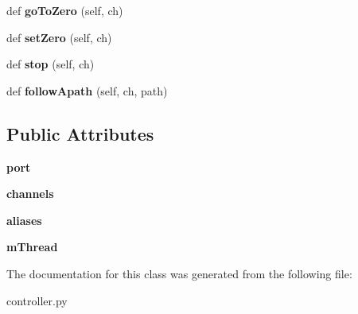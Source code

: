 \begin{DoxyCompactItemize}
\item 
\hypertarget{classpyagilis_1_1controller_1_1_a_g_u_c8_ac6a1b091b8351096db6abd5d9aa09a42}{}def {\bfseries go\+To\+Zero} (self, ch)\label{classpyagilis_1_1controller_1_1_a_g_u_c8_ac6a1b091b8351096db6abd5d9aa09a42}

\item 
\hypertarget{classpyagilis_1_1controller_1_1_a_g_u_c8_a792b3c9ce6d0365b65d1bf75acf9c179}{}def {\bfseries set\+Zero} (self, ch)\label{classpyagilis_1_1controller_1_1_a_g_u_c8_a792b3c9ce6d0365b65d1bf75acf9c179}

\item 
\hypertarget{classpyagilis_1_1controller_1_1_a_g_u_c8_af8908bdd36660efbf728cf9e216ae283}{}def {\bfseries stop} (self, ch)\label{classpyagilis_1_1controller_1_1_a_g_u_c8_af8908bdd36660efbf728cf9e216ae283}

\item 
\hypertarget{classpyagilis_1_1controller_1_1_a_g_u_c8_aba2c96a77f17f21613d07f152abee0a3}{}def {\bfseries follow\+Apath} (self, ch, path)\label{classpyagilis_1_1controller_1_1_a_g_u_c8_aba2c96a77f17f21613d07f152abee0a3}

\end{DoxyCompactItemize}
\subsection*{Public Attributes}
\begin{DoxyCompactItemize}
\item 
\hypertarget{classpyagilis_1_1controller_1_1_a_g_u_c8_a1fbc03520bbc818fa6b7068c2d18082c}{}{\bfseries port}\label{classpyagilis_1_1controller_1_1_a_g_u_c8_a1fbc03520bbc818fa6b7068c2d18082c}

\item 
\hypertarget{classpyagilis_1_1controller_1_1_a_g_u_c8_a0e10ce1697aba8e72640dfcb70a20676}{}{\bfseries channels}\label{classpyagilis_1_1controller_1_1_a_g_u_c8_a0e10ce1697aba8e72640dfcb70a20676}

\item 
\hypertarget{classpyagilis_1_1controller_1_1_a_g_u_c8_a808be674a6d2dd0227d90260b8e84c5a}{}{\bfseries aliases}\label{classpyagilis_1_1controller_1_1_a_g_u_c8_a808be674a6d2dd0227d90260b8e84c5a}

\item 
\hypertarget{classpyagilis_1_1controller_1_1_a_g_u_c8_ab8f488a1f3eb3142d82a38ff8c4303e4}{}{\bfseries m\+Thread}\label{classpyagilis_1_1controller_1_1_a_g_u_c8_ab8f488a1f3eb3142d82a38ff8c4303e4}

\end{DoxyCompactItemize}


The documentation for this class was generated from the following file\+:\begin{DoxyCompactItemize}
\item 
controller.\+py\end{DoxyCompactItemize}
